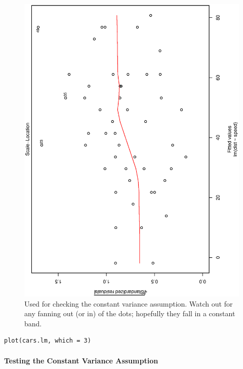 \documentclass[captions=tableheading]{scrbook}
\begin{document}
\begin{figure}[th]
  \includegraphics[angle=270, totalheight=4in]{ps/std-resids-fitted-cars.ps}
  \caption[Plot of standardized residuals against the fitted values for the \texttt{cars} data]{\small Used for checking the constant variance assumption. Watch out for any fanning out (or in) of the dots; hopefully they fall in a constant band.}
  \label{fig:std-resids-fitted-cars}
\end{figure}


\begin{verbatim}
plot(cars.lm, which = 3)
\end{verbatim}





\paragraph*{Testing the Constant Variance Assumption}
\end{document}
